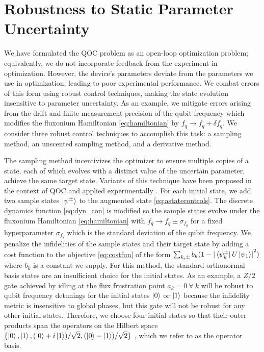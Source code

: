 \section{Robustness to Static Parameter Uncertainty \label{sec:static}}
We have formulated the QOC
problem as an open-loop optimization problem; equivalently,
we do not incorporate feedback from the experiment in optimization.
However, the device's parameters deviate from the parameters we use in optimization,
leading to poor experimental performance. We combat errors
of this form using robust control techniques,
making the state evolution insensitive
to parameter uncertainty. As an example,
we mitigate errors arising from the drift and finite measurement
precision of the qubit frequency which modifies the fluxonium Hamiltonian
\eqref{eq:hamiltonian} by $f_{q} \rightarrow f_{q} + \delta f_{q}$.
We consider three robust control techniques to accomplish this task:
a sampling method, an unscented sampling method,
and a derivative method.

The sampling method incentivizes the optimizer
to ensure multiple copies of a state, each of which evolves
with a distinct value of the uncertain parameter, achieve
the same target state. Variants of this technique have been proposed
in the context of QOC
\cite{allen2019robust, ball2020software, khaneja2005optimal,
  reinhold2019controlling, rembold2020introduction} and applied
experimentally \cite{carvalho2020error}.
For each initial state,
we add two sample states $\ket{\psi^{\pm}}$
to the augmented state \eqref{eq:astatecontrols}. The discrete dynamics
function \eqref{eq:dyn_con} is modified
so the sample states evolve under the fluxonium Hamiltonian \eqref{eq:hamiltonian}
with $f_{q} \rightarrow f_{q} \pm \sigma_{f_{q}}$ for a fixed
hyperparameter $\sigma_{f_{q}}$ which is the standard deviation of the qubit frequency.
We penalize the infidelities of the sample states and their target state
by adding a cost function to the objective \eqref{eq:costfun} of the form
$\sum_{k, \pm} b_{k} (1 - {\lvert \bra*{\psi^{\pm}_{k}}U\ket*{\psi_{1}} \rvert}^{2})$
where $b_{k}$ is a constant we supply.
For this method, the standard orthonormal basis states are an insufficient choice
for the initial states. As an example, a $Z/2$ gate achieved by idling
at the flux frustration point $a_{k} = 0 \ \forall \ k$
will be robust to qubit frequency detunings for the initial states $\ket{0}$
or $\ket{1}$ because the infidelity metric is insensitive to global phases,
but this gate will not be robust for any other initial states.
Therefore, we choose four initial states
so that their outer products
span the operators on the Hilbert space
$\{\ket{0}, \ket{1}, (\ket{0} + i\ket{1}) / \sqrt{2},
(\ket{0} - \ket{1}) / \sqrt{2}\}$ \cite{chow2009randomized},
which we refer to as the operator basis.

